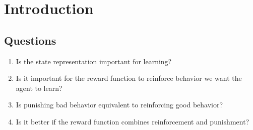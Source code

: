 \documentclass[report.tex]{subfiles}
\begin{document}
    \section*{\centering Introduction}


    \subsection*{Questions}

    \begin{enumerate}
        \item Is the state representation important for learning?
        \item Is it important for the reward function to reinforce behavior we want the agent to learn?
        \item Is punishing bad behavior equivalent to reinforcing good behavior?
        \item Is it better if the reward function combines reinforcement and punishment?
    \end{enumerate}
\end{document}
